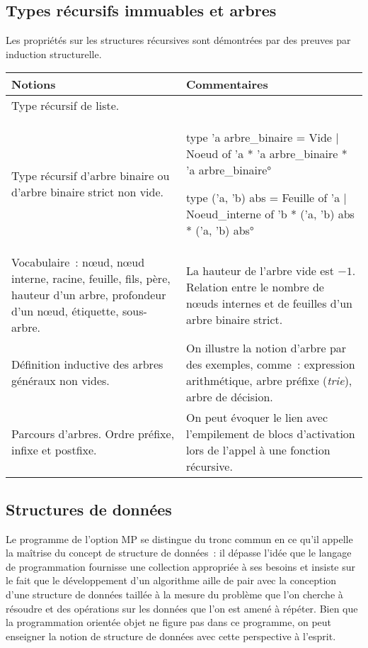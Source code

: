 \subsection{Types récursifs immuables et arbres}

Les propriétés sur les structures récursives sont démontrées par des preuves par induction structurelle.

\begin{longtable}{|p{\lnotion}|p{\comment}|}
    \hline
    \textbf{Notions} & \textbf{Commentaires} \\
    \hline\hline
    Type récursif de liste. & \\
    \hline
    Type récursif d'arbre binaire ou d'arbre binaire strict non vide.
                                          &
\°type 'a arbre_binaire = Vide | Noeud of 'a * 'a arbre_binaire * 'a arbre_binaire°

\°type ('a, 'b) abs = Feuille of 'a | Noeud_interne of 'b * ('a, 'b) abs * ('a, 'b) abs°
    \\
    Vocabulaire~: n\oe ud, n\oe ud interne, racine, feuille, fils, père, hauteur d'un arbre, profondeur d'un n\oe ud, étiquette, sous-arbre. & La hauteur de l'arbre vide est $-1$. Relation entre le nombre de nœuds internes et de feuilles d'un arbre binaire strict.
    \\ \hline
    Définition inductive des arbres généraux non vides. & On illustre la notion d'arbre par des exemples, comme~: expression arithmétique, arbre préfixe (\textit{trie}), arbre de décision. \\ \hline
    Parcours d'arbres. Ordre préfixe, infixe et postfixe. & On peut évoquer le lien avec l'empilement de blocs d'activation lors de l'appel à une fonction récursive. \\
   \hline
    
    
\end{longtable}

\subsection{Structures de données}

Le programme de l'option MP se distingue du tronc commun en ce qu'il appelle la maîtrise du concept de structure de données~: il dépasse l'idée que le langage de programmation fournisse une collection appropriée à ses besoins et insiste sur le fait que le développement d'un algorithme aille de pair avec la conception d'une structure de données taillée à la mesure du problème que l'on cherche à résoudre et des opérations sur les données que l'on est amené à répéter. Bien que la programmation orientée objet ne figure pas dans ce programme, on peut enseigner la notion de structure de données avec cette perspective à l'esprit.


